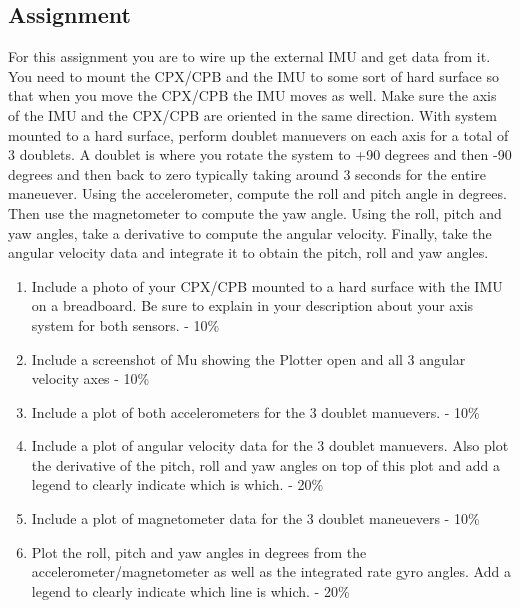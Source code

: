 \subsection{Assignment}

For this assignment you are to wire up the external IMU and get data from it. You need to mount the CPX/CPB and the IMU to some sort of hard surface so that when you move the CPX/CPB the IMU moves as well. Make sure the axis of the IMU and the CPX/CPB are oriented in the same direction. With system mounted to a hard surface, perform doublet manuevers on each axis for a total of 3 doublets. A doublet is where you rotate the system to +90 degrees and then -90 degrees and then back to zero typically taking around 3 seconds for the entire maneuever. Using the accelerometer, compute the roll and pitch angle in degrees. Then use the magnetometer to compute the yaw angle. Using the roll, pitch and yaw angles, take a derivative to compute the angular velocity. Finally, take the angular velocity data and integrate it to obtain the pitch, roll and yaw angles. 



\begin{enumerate}[itemsep=-5pt]
\item Include a photo of your CPX/CPB mounted to a hard surface with the IMU on a breadboard. Be sure to explain in your description about your axis system for both sensors. - 10\%
\item Include a screenshot of Mu showing the Plotter open and all 3 angular velocity axes - 10\%
\item Include a plot of both accelerometers for the 3 doublet manuevers. - 10\%
\item Include a plot of angular velocity data for the 3 doublet manuevers. Also plot the derivative of the pitch, roll and yaw angles on top of this plot and add a legend to clearly indicate which is which. - 20\%
\item Include a plot of magnetometer data for the 3 doublet maneuevers - 10\%
\item Plot the roll, pitch and yaw angles in degrees from the accelerometer/magnetometer as well as the integrated rate gyro angles. Add a legend to clearly indicate which line is which. - 20\%
\end{enumerate}
